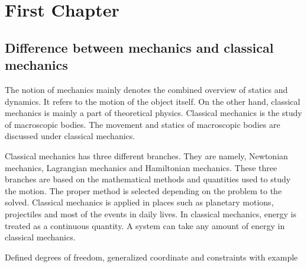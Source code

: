 \documentclass[../main-sheet.tex]{subfiles}
\begin{document}
\chapter{First Chapter}
\section{Difference between mechanics and classical mechanics}
The notion of mechanics mainly denotes the combined overview of statics and dynamics. It refers to the motion of the object itself. On the other hand, classical mechanics is mainly a part of theoretical physics. Classical mechanics is the study of macroscopic bodies. The movement and statics of macroscopic bodies are discussed under classical mechanics.

Classical mechanics has three different branches. They are namely, Newtonian mechanics, Lagrangian mechanics and Hamiltonian mechanics. These three branches are based on the mathematical methods and quantities used to study the motion. The proper method is selected depending on the problem to the solved. Classical mechanics is applied in places such as planetary motions, projectiles and most of the events in daily lives. In classical mechanics, energy is treated as a continuous quantity. A system can take any amount of energy in classical mechanics.

\begin{prob}
    Defined degrees of freedom, generalized coordinate and constraints with example
\end{prob}
\end{document}
